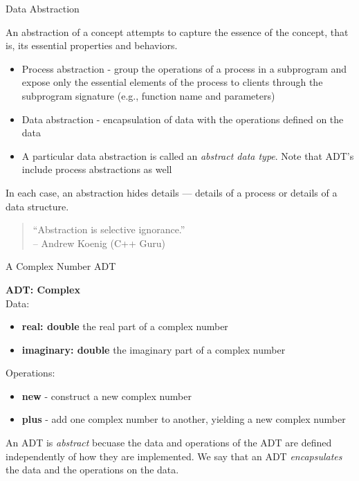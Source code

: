 \documentclass{beamer}
\author[Chris Simpkins] 
{Christopher Simpkins \\\texttt{chris.simpkins@gatech.edu}}
\institute[Georgia Tech] %
\date[CS 1331]{}
\title[\course] %
{\lesson}
\subtitle{}
\begin{document}
\begin{frame}
  \titlepage
\end{frame}


\begin{frame}{Data Abstraction}


An abstraction of a concept attempts to capture the essence of the concept, that is, its essential properties and behaviors.
\begin{itemize}
\item Process abstraction - group the operations of a process in a subprogram and expose only the essential elements of the process to clients through the subprogram signature (e.g., function name and parameters)
\item Data abstraction - encapsulation of data with the operations defined on the data
\item A particular data abstraction is called an {\em abstract data type}.  Note that ADT's include process abstractions as well
\end{itemize}

In each case, an abstraction hides details --- details of a process or details of a data structure.

\begin{quote}
``Abstraction is selective ignorance.''\\
-- Andrew Koenig (C++ Guru) 
\end{quote}
\end{frame}

\begin{frame}[fragile]{A Complex Number ADT}


{\bf ADT: Complex}\\
Data:
\begin{itemize}
\item {\bf real: double} the real part of a complex number
\item {\bf imaginary: double} the imaginary part of a complex number
\end{itemize}
Operations:
\begin{itemize}
\item {\bf new} - construct a new complex number
\item {\bf plus} - add one complex number to another, yielding a new complex number
\end{itemize}
An ADT is {\it abstract} becuase the data and operations of the ADT are defined independently of how they are implemented.  We say that an ADT {\it encapsulates} the data and the operations on the data.

\end{frame}
\end{document}
